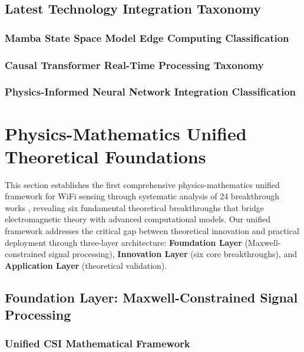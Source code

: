 \documentclass[journal]{IEEEtran}
\begin{document}
\subsection{Latest Technology Integration Taxonomy}
\subsubsection{Mamba State Space Model Edge Computing Classification}
\subsubsection{Causal Transformer Real-Time Processing Taxonomy}
\subsubsection{Physics-Informed Neural Network Integration Classification}

\section{Physics-Mathematics Unified Theoretical Foundations}
\label{sec:physics_theory}

This section establishes the first comprehensive physics-mathematics unified framework for WiFi sensing through systematic analysis of 24 breakthrough works \cite{chen2018wifi,raissi2019physics,luo2025physics,chen2024efficientfi,wang2022airfi,chen2024wiphase}, revealing six fundamental theoretical breakthroughs that bridge electromagnetic theory with advanced computational models. Our unified framework addresses the critical gap between theoretical innovation and practical deployment through three-layer architecture: \textbf{Foundation Layer} (Maxwell-constrained signal processing), \textbf{Innovation Layer} (six core breakthroughs), and \textbf{Application Layer} (theoretical validation).

\subsection{Foundation Layer: Maxwell-Constrained Signal Processing}

\subsubsection{Unified CSI Mathematical Framework}
\end{document}

